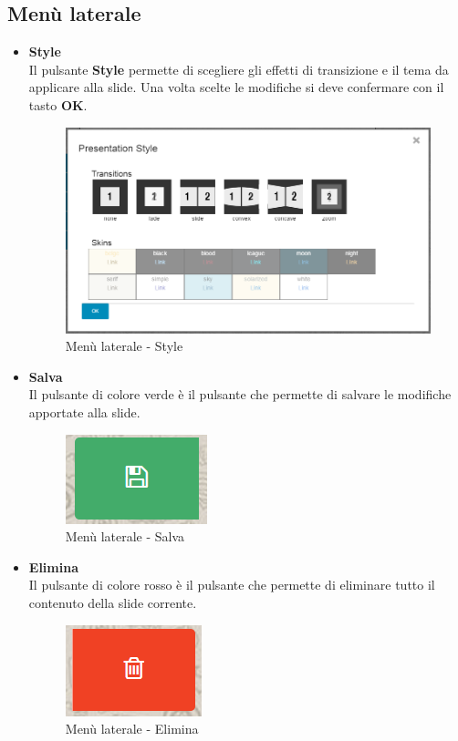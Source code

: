 \subsection{Menù laterale}
\begin{itemize}
 \item \textbf{Style}\\
    Il pulsante \textbf{Style} permette di scegliere gli effetti di transizione e il tema da applicare alla slide. Una volta scelte le modifiche si deve confermare con il tasto \textbf{OK}.	
    \begin{figure}[H] 
    	\centering 
    	\includegraphics[scale=0.40] {img/editor_style.png}
    	\caption{Menù laterale - Style} 
    \end{figure}
	
 \item \textbf{Salva}\\
	Il pulsante di colore verde è il pulsante che permette di salvare le modifiche apportate alla slide. 	
	\begin{figure}[H] 
		\centering 
		\includegraphics[scale=0.40] {img/editor_save.png}
		\caption{Menù laterale - Salva} 
	\end{figure}
	
	 \item \textbf{Elimina}\\
	 Il pulsante di colore rosso è il pulsante che permette di eliminare tutto il contenuto della slide corrente.  	
	 \begin{figure}[H] 
	 	\centering 
	 	\includegraphics[scale=0.40] {img/editor_del.png}
	 	\caption{Menù laterale - Elimina} 
	 \end{figure}
	

\end{itemize}
